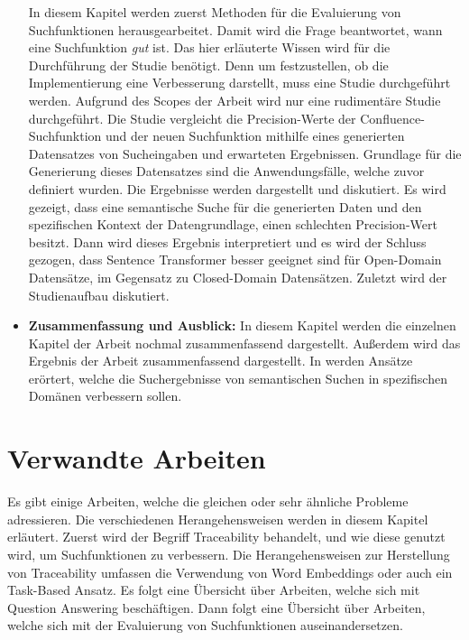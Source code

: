 \begin{itemize}
         In diesem Kapitel werden zuerst Methoden für die Evaluierung von Suchfunktionen herausgearbeitet.
         Damit wird die Frage beantwortet, wann eine Suchfunktion \textit{gut} ist.
         Das hier erläuterte Wissen wird für die Durchführung der Studie benötigt.
         Denn um festzustellen, ob die Implementierung eine Verbesserung darstellt, muss eine Studie durchgeführt werden.
         Aufgrund des Scopes der Arbeit wird nur eine rudimentäre Studie durchgeführt.
         Die Studie vergleicht die Precision-Werte der Confluence-Suchfunktion und der neuen Suchfunktion mithilfe eines generierten Datensatzes von Sucheingaben und erwarteten Ergebnissen.
         Grundlage für die Generierung dieses Datensatzes sind die Anwendungsfälle, welche zuvor definiert wurden.
         Die Ergebnisse werden dargestellt und diskutiert.
         Es wird gezeigt, dass eine semantische Suche für die generierten Daten und den spezifischen Kontext der Datengrundlage, einen schlechten Precision-Wert besitzt. 
         Dann wird dieses Ergebnis interpretiert und es wird der Schluss gezogen, dass Sentence Transformer besser geeignet sind für Open-Domain Datensätze, im Gegensatz zu Closed-Domain Datensätzen.
         Zuletzt wird der Studienaufbau diskutiert.
    \item \textbf{Zusammenfassung und Ausblick:}
         In diesem Kapitel werden die einzelnen Kapitel der Arbeit nochmal zusammenfassend dargestellt.
         Außerdem wird das Ergebnis der Arbeit zusammenfassend dargestellt.
         In  werden Ansätze erörtert, welche die Suchergebnisse von semantischen Suchen in spezifischen Domänen verbessern sollen.
\end{itemize}

\section{Verwandte Arbeiten}
Es gibt einige Arbeiten, welche die gleichen oder sehr ähnliche Probleme adressieren.
Die verschiedenen Herangehensweisen werden in diesem Kapitel erläutert.
Zuerst wird der Begriff Traceability behandelt, und wie diese genutzt wird, um Suchfunktionen zu verbessern.
Die Herangehensweisen zur Herstellung von Traceability umfassen die Verwendung von Word Embeddings oder auch ein Task-Based Ansatz.
Es folgt eine Übersicht über Arbeiten, welche sich mit Question Answering beschäftigen.
Dann folgt eine Übersicht über Arbeiten, welche sich mit der Evaluierung von Suchfunktionen auseinandersetzen.\\

